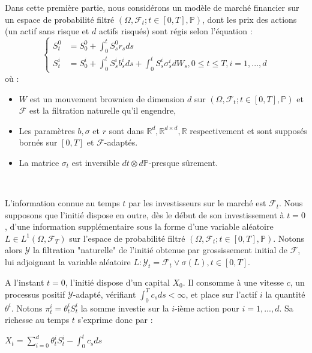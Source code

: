 \documentclass[../finalreport.tex]{subfiles}
\begin{document}
\par Dans cette première partie, nous considérons un modèle de marché financier sur un espace de probabilité filtré $(\Omega, \mathcal{F}_t; t \in [0,T], \mathbb{P})$, dont les prix des actions (un actif sans risque et $d$ actifs risqués) sont régis selon l'équation : 
\begin{equation}
\begin{cases}
S^0_t &= S_0^0 + \int_{0}^{t} S^0_s r_s ds \\
\displaystyle S_t^i &= S_0^i + \int_{0}^{t} S_s^i b_s^i ds +  \int_{0}^{t} S_s^i \sigma_s^i dW_s, 0\leq t \leq T, i = 1,...,d
\end{cases}
\end{equation}
où :

\begin{itemize}
\item $W$ est un mouvement brownien de dimension $d$ sur $(\Omega, \mathcal{F}_t; t \in [0,T], \mathbb{P})$ et $\mathcal{F}$ est la filtration naturelle qu'il engendre,
\item Les paramètres $b, \sigma$ et $r$ sont dans $\mathbb{R}^d, \mathbb{R}^{d\times d}, \mathbb{R}$ respectivement et sont supposés bornés sur $[0,T]$ et $\mathcal{F}$-adaptés.
\item La matrice $\sigma_t$ est inversible $dt \otimes d\mathbb{P}$-presque sûrement.
\end{itemize}
\

\par L'information connue au temps $t$ par les investisseurs sur le marché est $\mathcal{F}_t$.
Nous supposons que l'initié dispose en outre, dès le début de son investissement à $t=0$, d'une information supplémentaire sous la forme d'une variable aléatoire $L \in L^1(\Omega, \mathcal{F}_T)$ sur l'espace de probabilité filtré $(\Omega, \mathcal{F}_t; t \in [0,T], \mathbb{P})$. 
Notons alors $\mathcal{Y}$ la filtration "naturelle" de l'initié obtenue par grossissement initial de $\mathcal{F}$, lui adjoignant la variable aléatoire $L : \mathcal{Y}_t = \mathcal{F}_t \vee \sigma(L), t \in [0, T]$.\\

\par A l'instant $t=0$, l'initié dispose d'un capital $X_0$. Il consomme à une vitesse $c$, un processus positif $\mathcal{Y}$-adapté, vérifiant $\int_{0}^{T} c_s ds < \infty$, et place sur l'actif $i$ la quantité $\theta^i$. Notons $\pi_t^i = \theta^i_t S_t^i$ la somme investie sur la $i$-ième action pour $i =1, ..., d$. Sa richesse au temps $t$ s'exprime donc par : 
\begin{center}
$X_t = \displaystyle \sum_{i=0}^{d} \theta^i_t S_t^i - \int_{0}^{t} c_s ds$
\end{center}
\end{document}
